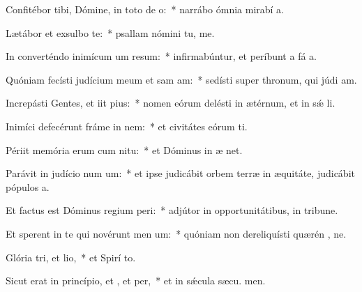 \item Confitébor tibi, Dómine, in toto de o:~* narrábo ómnia mirabí a.
\item Lætábor et exsulbo  te:~* psallam nómini tu, me.
\item In converténdo inimícum um resum:~* infirmabúntur, et períbunt a fá a.
\item Quóniam fecísti judícium meum et sam am:~* sedísti super thronum, qui júdi am.
\item Increpásti Gentes, et iit pius:~* nomen eórum delésti in ætérnum, et in sǽ li.
\item Inimíci defecérunt fráme in nem:~* et civitátes eórum ti.
\item Périit memória erum cum nitu:~* et Dóminus in æ net.
\item Parávit in judício num um:~* et ipse judicábit orbem terræ in æquitáte, judicábit pópulos  a.
\item Et factus est Dóminus regium peri:~* adjútor in opportunitátibus, in tribune.
\item Et sperent in te qui novérunt men um:~* quóniam non dereliquísti quærén , ne.
\item Glória tri, et lio,~* et Spirí to.
\item Sicut erat in princípio, et , et per,~* et in sǽcula sæcu. men.
